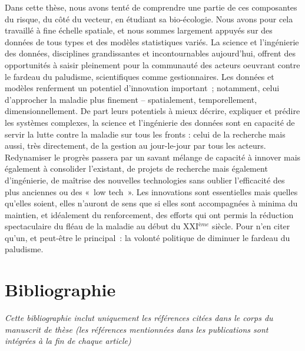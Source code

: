 \documentclass[12pt,twoside]{reedthesis}
\begin{document}
Dans cette thèse, nous avons tenté de comprendre une partie de ces composantes du risque, du côté du vecteur, en étudiant sa bio-écologie. Nous avons pour cela travaillé à fine échelle spatiale, et nous sommes largement appuyés sur des données de tous types et des modèles statistiques variés. La science et l'ingénierie des données, disciplines grandissantes et incontournables aujourd'hui, offrent des opportunités à saisir pleinement pour la communauté des acteurs oeuvrant contre le fardeau du paludisme, scientifiques comme gestionnaires. Les données et modèles renferment un potentiel d'innovation important~; notamment, celui d'approcher la maladie plus finement -- spatialement, temporellement, dimensionnellement. De part leurs potentiels à mieux décrire, expliquer et prédire les systèmes complexes, la science et l'ingénierie des données sont en capacité de servir la lutte contre la maladie sur tous les fronts : celui de la recherche mais aussi, très directement, de la gestion au jour-le-jour par tous les acteurs.\\

Redynamiser le progrès passera par un savant mélange de capacité à innover mais également à consolider l'existant, de projets de recherche mais également d'ingénierie, de maîtrise des nouvelles technologies sans oublier l'efficacité des plus anciennes ou des «~low tech~». Les innovations sont essentielles mais quelles qu'elles soient, elles n'auront de sens que si elles sont accompagnées à minima du maintien, et idéalement du renforcement, des efforts qui ont permis la réduction spectaculaire du fléau de la maladie au début du XXI\(^{ème}\) siècle. Pour n'en citer qu'un, et peut-être le principal~: la volonté politique de diminuer le fardeau du paludisme.

\pagebreak

\hypertarget{bibliographie}{%
\chapter*{Bibliographie}\label{bibliographie}}

\markboth{}{}

\emph{Cette bibliographie inclut uniquement les références citées dans le corps du manuscrit de thèse (les références mentionnées dans les publications sont intégrées à la fin de chaque article)}\\

\begingroup

\noindent
\vspace{-2em}
\setlength{\parindent}{-0.4in}
\setlength{\leftskip}{0.4in}
\setlength{\parskip}{15pt}
\end{document}
